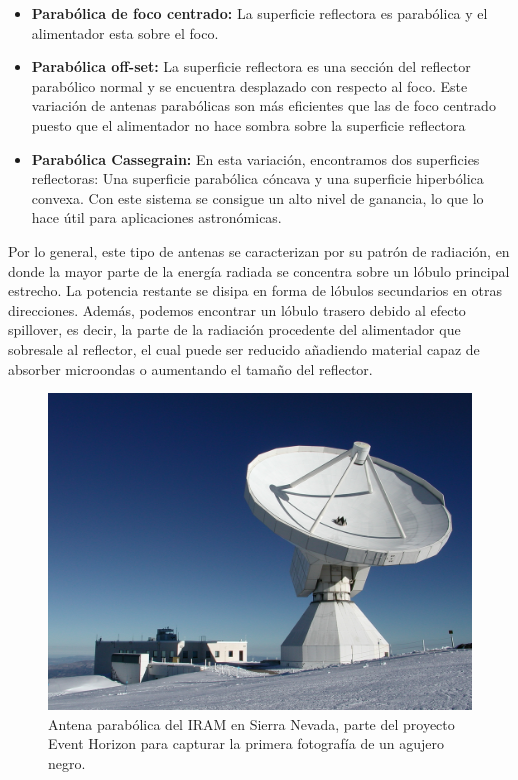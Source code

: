 \begin{itemize}
	\item \textbf{Parabólica de foco centrado: }La superficie reflectora es parabólica y el alimentador esta sobre el foco.
	\item \textbf{Parabólica off-set: }La superficie reflectora es una sección del reflector parabólico normal y se encuentra desplazado con respecto al foco. Este variación de antenas parabólicas son más eficientes que las de foco centrado puesto que el alimentador no hace sombra sobre la superficie reflectora
	\item \textbf{Parabólica Cassegrain: }En esta variación, encontramos dos superficies reflectoras: Una superficie parabólica cóncava y una superficie hiperbólica convexa. Con este sistema se consigue un alto nivel de ganancia, lo que lo hace útil para aplicaciones astronómicas.
\end{itemize}

\par Por lo general, este tipo de antenas se caracterizan por su patrón de radiación, en donde la mayor parte de la energía radiada se concentra sobre un lóbulo principal estrecho. La potencia restante se disipa en forma de lóbulos secundarios en otras direcciones. Además, podemos encontrar un lóbulo trasero debido al efecto spillover, es decir, la parte de la radiación procedente del alimentador que sobresale al reflector, el cual puede ser reducido añadiendo material capaz de absorber microondas o aumentando el tamaño del reflector. 


\begin{figure}[h]
    \centering
        \includegraphics[width=12cm]{archivos/parab}
        \caption{Antena parabólica del IRAM en Sierra Nevada, parte del proyecto Event Horizon para capturar la primera fotografía de un agujero negro. \citep{MICIU2019}}
        \label{fig:parabolica}
\end{figure}

